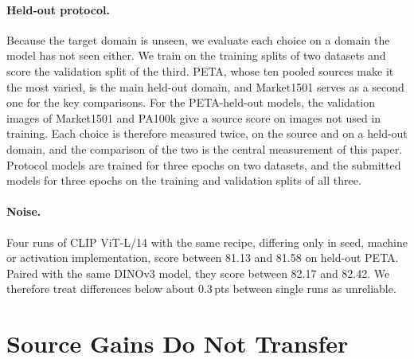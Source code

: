 \documentclass[10pt,twocolumn,letterpaper]{article}
\newcommand{\pts}{\,pts}
\begin{document}
\begin{table}[t]
\centering\small
\setlength{\tabcolsep}{3pt}
\caption{Training data of UPAR 2027 Track~1.}
\label{tab:data}
\end{table}

\paragraph{Held-out protocol.} Because the target domain is unseen, we evaluate each choice on a domain the model has not seen either. We train on the training splits of two datasets and score the validation split of the third. PETA, whose ten pooled sources make it the most varied, is the main held-out domain, and Market1501 serves as a second one for the key comparisons. For the PETA-held-out models, the validation images of Market1501 and PA100k give a source score on images not used in training. Each choice is therefore measured twice, on the source and on a held-out domain, and the comparison of the two is the central measurement of this paper. Protocol models are trained for three epochs on two datasets, and the submitted models for three epochs on the training and validation splits of all three.

\paragraph{Noise.} Four runs of CLIP ViT-L/14 with the same recipe, differing only in seed, machine or activation implementation, score between 81.13 and 81.58 on held-out PETA. Paired with the same DINOv3 model, they score between 82.17 and 82.42. We therefore treat differences below about 0.3\pts{} between single runs as unreliable.

\section{Source Gains Do Not Transfer}
\label{sec:transfer}
\end{document}
